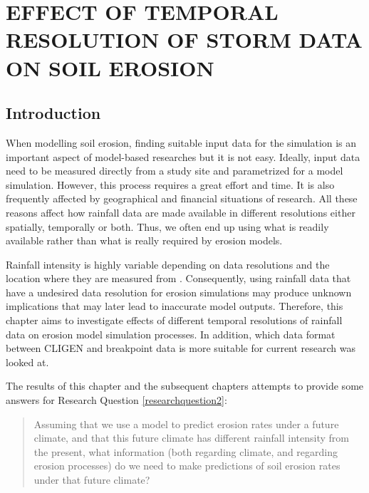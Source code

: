 \chapter{EFFECT OF TEMPORAL RESOLUTION OF STORM DATA ON SOIL EROSION}
\label{sec:EFFECTSOFTEMPORALSCALESOFSTROMDATA}

\section{Introduction}
\label{sec:TemporalScalesEffectsIntroduction}

When modelling soil erosion, finding suitable input data for the simulation is
an important aspect of model-based researches but it is not easy. Ideally, input
data need to be measured directly from a study site and parametrized for a model
simulation. However, this process requires a great effort and time. It is also
frequently affected by geographical and financial situations of research. All
these reasons affect how rainfall data are made available in different
resolutions either spatially, temporally or both. Thus, we often end up using
what is readily available rather than what is really required by erosion models.

Rainfall intensity is highly variable depending on data resolutions and the
location where they are measured from \citep{nyssen2005-172}. Consequently,
using rainfall data that have a undesired data resolution for erosion
simulations may produce unknown implications that may later lead to inaccurate
model outputs. Therefore, this chapter aims to investigate effects of different
temporal resolutions of rainfall data on erosion model simulation processes. In
addition, which data format between CLIGEN and breakpoint data is more suitable
for current research was looked at.

The results of this chapter and the subsequent chapters attempts to provide some
answers for Research Question \ref{researchquestion2}:\
\begin{quotation}
Assuming that we use a model to predict erosion rates under a future
climate, and that this future climate has different rainfall intensity from the
present, what information (both regarding climate, and regarding erosion
processes) do we need to make predictions of soil erosion rates under that
future climate?
\end{quotation}

